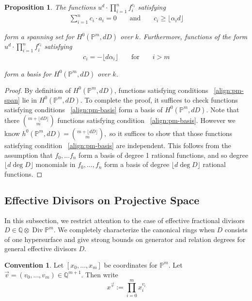 \documentclass{amsart}
\theoremstyle{plain}
\newtheorem{prop}[thm]{Proposition}
\theoremstyle{definition}
\newtheorem{convention}[thm]{Convention}
\theoremstyle{remark}
\numberwithin{equation}{section}
\newcommand\ssec{\subsection}
\newcommand\bq{{\mathbb Q}}
\newcommand\bp{{\mathbb P}}
\DeclareMathOperator\di{Div}
\newcommand\bida{a}
\begin{document}
\begin{prop}
\label{prop:pm-span-and-basis}
The functions $u^d \cdot \prod_{i=1}^n f_i^{c_i}$ satisfying
\begin{align}
\label{align:pm-span}
\sum_{i=1}^{n} c_i \cdot \bida_i = 0 && \text{ and } &&c_i \geq \lfloor \alpha_i d\rfloor	
\end{align}

\noindent
form a spanning set for $H^0(\bp^m, dD)$ over $k$. Furthermore, functions 
of the form $u^d \cdot \prod_{i=1}^n f_i^{c_i}$ satisfying
\begin{align}
\label{align:pm-basis}
c_i = -\lfloor d\alpha_i \rfloor && \text{ for } && i > m
\end{align}

\noindent
form a basis for $H^0(\bp^m, dD)$ over $k$.
\end{prop}

\begin{proof}
By definition of $H^0(\bp^m,dD)$, functions satisfying conditions 
~\eqref{align:pm-span} lie in $H^0(\bp^m,dD)$. To complete the proof, it
suffices to check functions satisfying conditions ~\eqref{align:pm-basis} form
a basis of $H^0(\bp^m,dD)$. Note that there $\binom{m+ \lfloor dD \rfloor }{m}$
functions satisfying condition ~\eqref{align:pm-basis}. However we know
$h^0(\bp^m,dD) = \binom{m+ \lfloor dD \rfloor }{m},$ so it suffices to show
that those functions satisfying condition ~\eqref{align:pm-basis} are
independent. This follows from the assumption that $f_0,\ldots f_n$ form a
basis of degree 1 rational functions, and so degree $\lfloor d \deg D \rfloor $
monomials in $f_0,\ldots, f_n$ form a basis of degree $\lfloor d \deg D \rfloor
$ rational functions.
\end{proof}

\ssec{Effective Divisors on Projective Space}
\label{ssec:proj-one-point}

In this subsection, we restrict attention to the case of effective
fractional divisors $D \in \bq \otimes \di \bp^m$. We completely
characterize the canonical rings when $D$ consists of one
hypersurface and give strong bounds on generator and relation
degrees for general effective divisors $D$.

\begin{convention}
Let $[x_0, \ldots, x_m]$ be coordinates for $\bp^m$. Let
$\vec{v} = (v_0, \ldots, v_m) \in \bq^{m + 1}$. Then write
\[
	x^{\vec{v}} := \prod_{i = 0}^{m} x_i^{v_i}
\]
\end{convention}
\end{document}
